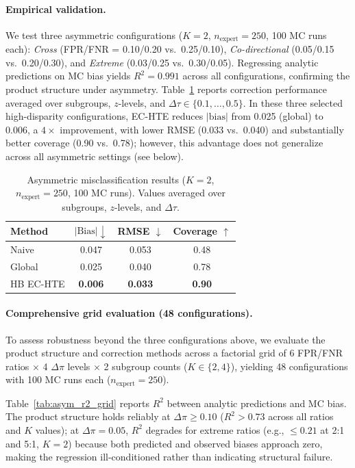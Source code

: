 \paragraph{Empirical validation.}
We test three asymmetric configurations ($K{=}2$, $n_{\text{expert}}{=}250$, 100 MC runs each): \emph{Cross} (FPR/FNR = 0.10/0.20 vs.\ 0.25/0.10), \emph{Co-directional} (0.05/0.15 vs.\ 0.20/0.30), and \emph{Extreme} (0.03/0.25 vs.\ 0.30/0.05).
Regressing analytic predictions on MC bias yields $R^2 = 0.991$ across all configurations, confirming the product structure under asymmetry.
Table~\ref{tab:asymmetric} reports correction performance averaged over subgroups, $z$-levels, and $\Delta\tau \in \{0.1, \ldots, 0.5\}$.
In these three selected high-disparity configurations, EC-HTE reduces $|\text{bias}|$ from 0.025 (global) to 0.006, a $4\times$ improvement, with lower RMSE (0.033 vs.\ 0.040) and substantially better coverage (0.90 vs.\ 0.78); however, this advantage does not generalize across all asymmetric settings (see below).

\begin{table}[t]
\centering
\caption{Asymmetric misclassification results ($K{=}2$, $n_{\text{expert}}{=}250$, 100 MC runs). Values averaged over subgroups, $z$-levels, and $\Delta\tau$.}
\label{tab:asymmetric}
\small
\begin{tabular}{l ccc}
\toprule
Method & $|\text{Bias}| \downarrow$ & RMSE $\downarrow$ & Coverage $\uparrow$ \\
\midrule
Naive & 0.047 & 0.053 & 0.48 \\
Global & 0.025 & 0.040 & 0.78 \\
HB EC-HTE & \textbf{0.006} & \textbf{0.033} & \textbf{0.90} \\
\bottomrule
\end{tabular}
\end{table}

\paragraph{Comprehensive grid evaluation (48 configurations).}

To assess robustness beyond the three configurations above, we evaluate the product structure and correction methods across a factorial grid of 6 FPR/FNR ratios $\times$ 4 $\Delta\pi$ levels $\times$ 2 subgroup counts ($K \in \{2, 4\}$), yielding 48 configurations with 100 MC runs each ($n_{\text{expert}} = 250$).

Table~\ref{tab:asym_r2_grid} reports $R^2$ between analytic predictions and MC bias.
The product structure holds reliably at $\Delta\pi \geq 0.10$ ($R^2 > 0.73$ across all ratios and $K$ values); at $\Delta\pi = 0.05$, $R^2$ degrades for extreme ratios (e.g., $\leq 0.21$ at 2:1 and 5:1, $K{=}2$) because both predicted and observed biases approach zero, making the regression ill-conditioned rather than indicating structural failure.

